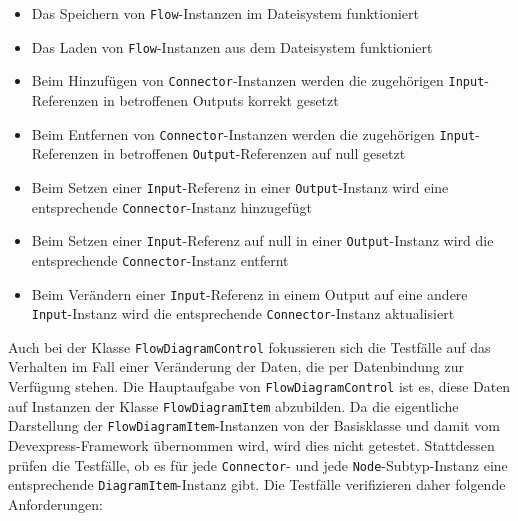 \begin{itemize}
\item Das Speichern von \texttt{Flow}-Instanzen im Dateisystem funktioniert
\item Das Laden von \texttt{Flow}-Instanzen aus dem Dateisystem funktioniert
\item Beim Hinzufügen von \texttt{Connector}-Instanzen werden die zugehörigen \texttt{Input}-Referenzen in betroffenen Outputs korrekt gesetzt
\item Beim Entfernen von \texttt{Connector}-Instanzen werden die zugehörigen \texttt{Input}-Referenzen in betroffenen \texttt{Output}-Referenzen auf null gesetzt
\item Beim Setzen einer \texttt{Input}-Referenz in einer \texttt{Output}-Instanz wird eine entsprechende \texttt{Connector}-Instanz hinzugefügt
\item Beim Setzen einer \texttt{Input}-Referenz auf null in einer \texttt{Output}-Instanz wird die entsprechende \texttt{Connector}-Instanz entfernt
\item Beim Verändern einer \texttt{Input}-Referenz in einem Output auf eine andere \texttt{Input}-Instanz wird die entsprechende \texttt{Connector}-Instanz aktualisiert 
\end{itemize}

Auch bei der Klasse \texttt{FlowDiagramControl} fokussieren sich die Testfälle auf das Verhalten im Fall einer Veränderung der Daten, die per Datenbindung zur Verfügung stehen. Die Hauptaufgabe von \texttt{FlowDiagramControl} ist es, diese Daten auf Instanzen der Klasse \texttt{FlowDiagramItem} abzubilden. Da die eigentliche Darstellung der \texttt{FlowDiagramItem}-Instanzen von der Basisklasse und damit vom Devexpress-Framework übernommen wird, wird dies nicht getestet. Stattdessen prüfen die Testfälle, ob es für jede \texttt{Connector}- und jede \texttt{Node}-Subtyp-Instanz eine entsprechende \texttt{DiagramItem}-Instanz gibt. Die Testfälle verifizieren daher folgende Anforderungen:

